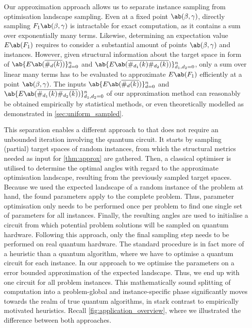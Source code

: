 Our approximation approach allows us to separate instance sampling from optimisation landscape sampling. Even at a fixed point $\ab(\mangle, \pangle)$, directly sampling $F_1 \ab(\mangle,\pangle)$ is intractable for
exact computation, as it contains a sum over exponentially many terms. Likewise, determining an expectation value $E\ab(F_1)$ requires to consider a substantial amount of points $\ab(\mangle, \pangle)$ and instances. However, given structural information about the target space in form of $\ab\{E\ab(\overline{\#_d (k)})\}_{d=0}^n$ and $\ab\{E\ab(\overline{\#_{d_1} (k) \#_{d_2} (k)})\}_{d_1, d_2 = 0}^n$, only a sum over linear many terms has to be evaluated to approximate $E\ab(F_1)$ efficiently at a point $\ab(\mangle, \pangle)$. The inputs $\ab\{E\ab(\overline{\#_d (k)})\}_{d=0}^n$ and $\ab\{E\ab(\overline{\#_{d_1} (k) \#_{d_2} (k)})\}_{d_1, d_2 = 0}^n$ of our approximation method can reasonably be obtained empirically by statistical methods, or even theoretically modelled as demonstrated in \cref{sec:uniform_sampled}.


This separation enables a different approach to \QAOA that does not require an unbounded iteration involving the quantum circuit. It starts by sampling (partial) target spaces of random instances, from which the structural metrics needed as input for \cref{thm:approx} are gathered. Then, a classical optimiser is utilised to determine the optimal \QAOA angles with regard to the approximate optimisation landscape, resulting from the previously sampled target spaces.
Because we used the expected landscape of a random instance of the problem at hand, the found parameters apply to the complete problem. Thus, parameter optimisation only needs to be performed once per problem to find one single set of parameters for
all instances.
Finally, the resulting angles are used to initialise a \QAOA circuit from which potential problem solutions will be sampled on quantum hardware. Following this approach, only the final sampling step needs to be performed on real quantum hardware. The standard \QAOA procedure is in fact more of a heuristic than a quantum algorithm, where we have to optimise a quantum circuit for each instance. In our approach to \QAOA we optimise the parameters on a error bounded approximation of the expected landscape. Thus, we end up with one circuit for all problem instances. This mathematically sound splitting of computation into a problem-global and instance-specific phase significantly moves \QAOA towards the realm of true quantum algorithms, in stark contrast to empirically motivated heuristics. Recall \cref{fig:application_overview}, where we illustrated the difference between both approaches.

